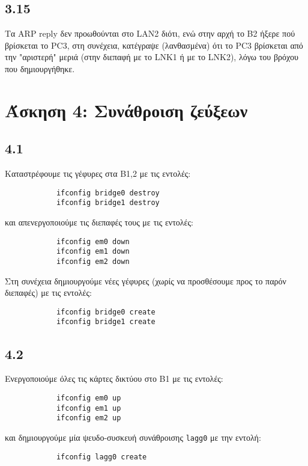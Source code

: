 \documentclass[a4paper, 12pt]{article}
\begin{document}
	\subsection*{3.15}
		Τα ARP reply δεν προωθούνται στο LAN2 διότι, ενώ στην αρχή το B2 ήξερε πού βρίσκεται το PC3, στη συνέχεια, κατέγραψε (λανθασμένα) ότι το PC3 βρίσκεται από την "αριστερή" μεριά (στην διεπαφή με το LNK1 ή με το LNK2), λόγω του βρόχου που δημιουργήθηκε.

\section*{Άσκηση 4: Συνάθροιση ζεύξεων}

	\subsection*{4.1}
		Καταστρέφουμε τις γέφυρες στα B1,2 με τις εντολές:
		
		\begin{verbatim}
			ifconfig bridge0 destroy
			ifconfig bridge1 destroy
		\end{verbatim}
		
		και απενεργοποιούμε τις διεπαφές τους με τις εντολές:
		
		\begin{verbatim}
			ifconfig em0 down
			ifconfig em1 down
			ifconfig em2 down
		\end{verbatim}
		
		Στη συνέχεια δημιουργούμε νέες γέφυρες (χωρίς να προσθέσουμε προς το παρόν διεπαφές) με τις εντολές:
		
		\begin{verbatim}
			ifconfig bridge0 create
			ifconfig bridge1 create
		\end{verbatim}

	\subsection*{4.2}
		Ενεργοποιούμε όλες τις κάρτες δικτύου στο B1 με τις εντολές: 
		
		\begin{verbatim}
			ifconfig em0 up
			ifconfig em1 up
			ifconfig em2 up
		\end{verbatim}
		
		και δημιουργούμε μία ψευδο-συσκευή συνάθροισης \verb|lagg0| με την εντολή:
		
		\begin{verbatim}
			ifconfig lagg0 create
		\end{verbatim}
\end{document}
